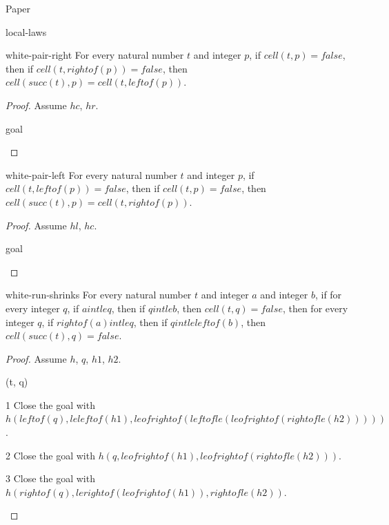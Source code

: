 \begin{lexlean}{Paper}
\begin{section}{local-laws}
  \begin{lemma}{white-pair-right}
  For every natural number \(t\) and integer \(p\), if \(cell(t, p) = false\), then if \(cell(t, rightof(p)) = false\), then \(cell(succ(t), p) = cell(t, leftof(p))\).
  \begin{proof}
  Assume \(hc\), \(hr\).
  \begin{rewrite}{goal}
  \end{rewrite}
  \end{proof}
  \end{lemma}

  \begin{lemma}{white-pair-left}
  For every natural number \(t\) and integer \(p\), if \(cell(t, leftof(p)) = false\), then if \(cell(t, p) = false\), then \(cell(succ(t), p) = cell(t, rightof(p))\).
  \begin{proof}
  Assume \(hl\), \(hc\).
  \begin{rewrite}{goal}
  \end{rewrite}
  \end{proof}
  \end{lemma}

  \begin{theorem}{white-run-shrinks}
  For every natural number \(t\) and integer \(a\) and integer \(b\), if for every integer \(q\), if \(a intle q\), then if \(q intle b\), then \(cell(t, q) = false\), then for every integer \(q\), if \(rightof(a) intle q\), then if \(q intle leftof(b)\), then \(cell(succ(t), q) = false\).
  \begin{proof}
  Assume \(h\), \(q\), \(h1\), \(h2\).
  \begin{apply}{(t, q)}
  \begin{premise}{1}
  Close the goal with \(h(leftof(q), leleftof(h1), leofrightof(leftofle(leofrightof(rightofle(h2)))))\).
  \end{premise}
  \begin{premise}{2}
  Close the goal with \(h(q, leofrightof(h1), leofrightof(rightofle(h2)))\).
  \end{premise}
  \begin{premise}{3}
  Close the goal with \(h(rightof(q), lerightof(leofrightof(h1)), rightofle(h2))\).
  \end{premise}
  \end{apply}
  \end{proof}
  \end{theorem}
\end{section}


\end{lexlean}
